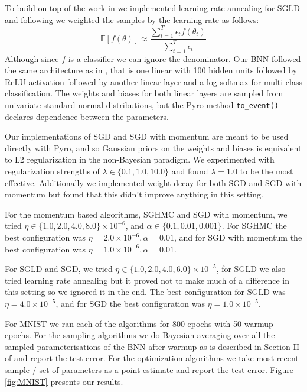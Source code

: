 To build on top of the work in \cite{sghmc} we implemented learning rate annealing for SGLD and following \cite{sgld} we weighted the samples by the learning rate as follows:
$$\mathbb{E}[f(\theta)] \approx \frac{\sum^T_{t=1} \epsilon_t f(\theta_t)}{\sum^T_{t=1} \epsilon_t}$$
Although since $f$ is a classifier we can ignore the denominator. Our BNN followed the same architecture as in \cite{sghmc}, that is one linear with 100 hidden units followed by ReLU activation followed by another linear layer and a log softmax for multi-class classification. The weights and biases for both linear layers are sampled from univariate standard normal distributions, but the Pyro method \texttt{to\_event()} declares dependence between the parameters. 

Our implementations of SGD and SGD with momentum are meant to be used directly with Pyro, and so Gaussian priors on the weights and biases is equivalent to L2 regularization in the non-Bayesian paradigm. We experimented with regularization strengths of $\lambda \in \{0.1, 1.0, 10.0\}$ and found $\lambda = 1.0$ to be the most effective. Additionally we implemented weight decay for both SGD and SGD with momentum but found that this didn't improve anything in this setting.

For the momentum based algorithms, SGHMC and SGD with momentum, we tried $\eta \in \{1.0, 2.0, 4.0, 8.0 \} \times 10^{-6}$, and $\alpha \in \{0.1, 0.01, 0.001 \}$. For SGHMC the best configuration was $\eta = 2.0\times 10^{-6}, \alpha=0.01$, and for SGD with momentum the best configuration was $\eta = 1.0\times 10^{-6}, \alpha=0.01$.

For SGLD and SGD, we tried $\eta \in \{1.0, 2.0, 4.0, 6.0\} \times 10^{-5}$, for SGLD we also tried learning rate annealing but it proved not to make much of a difference in this setting so we ignored it in the end. The best configuration for SGLD was $\eta = 4.0\times 10^{-5}$, and for SGD the best configuration was $\eta = 1.0\times 10^{-5}$.

For MNIST we ran each of the algorithms for 800 epochs with 50 warmup epochs. For the sampling algorithms we do Bayesian averaging over all the sampled parameterisations of the BNN after warmup as is described in Section II of \cite{hands-on-bnn} and report the test error. For the optimization algorithms we take most recent sample / set of parameters as a point estimate and report the test error.  Figure \ref{fig:MNIST} presents our results.

